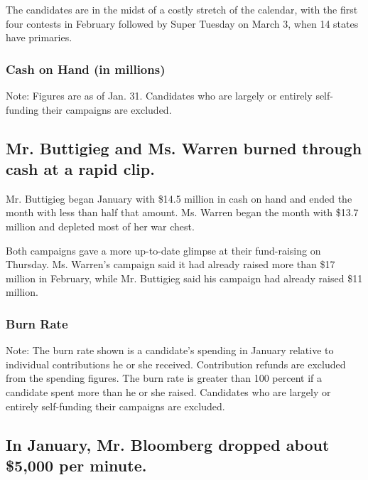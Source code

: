 The candidates are in the midst of a costly stretch of the calendar,
with the first four contests in February followed by Super Tuesday on
March 3, when 14 states have primaries.

\hypertarget{cash-on-hand-in-millions}{%
\subsubsection{Cash on Hand (in
millions)}\label{cash-on-hand-in-millions}}

Note: Figures are as of Jan. 31. Candidates who are largely or entirely
self-funding their campaigns are excluded.

\hypertarget{mr-buttigieg-and-ms-warren-burned-through-cash-at-a-rapid-clip}{%
\subsection{Mr. Buttigieg and Ms. Warren burned through cash at a rapid
clip.}\label{mr-buttigieg-and-ms-warren-burned-through-cash-at-a-rapid-clip}}

Mr. Buttigieg began January with \$14.5 million in cash on hand and
ended the month with less than half that amount. Ms. Warren began the
month with \$13.7 million and depleted most of her war chest.

Both campaigns gave a more up-to-date glimpse at their fund-raising on
Thursday. Ms. Warren's campaign said it had already raised more than
\$17 million in February, while Mr. Buttigieg said his campaign had
already raised \$11 million.

\hypertarget{burn-rate}{%
\subsubsection{Burn Rate}\label{burn-rate}}

Note: The burn rate shown is a candidate's spending in January relative
to individual contributions he or she received. Contribution refunds are
excluded from the spending figures. The burn rate is greater than 100
percent if a candidate spent more than he or she raised. Candidates who
are largely or entirely self-funding their campaigns are excluded.

\hypertarget{in-january-mr-bloomberg-dropped-about-5000-per-minute}{%
\subsection{In January, Mr. Bloomberg dropped about \$5,000 per
minute.}\label{in-january-mr-bloomberg-dropped-about-5000-per-minute}}

